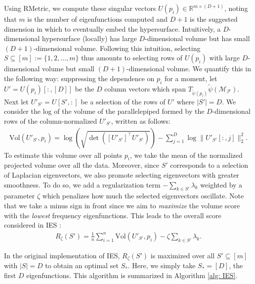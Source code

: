 \documentclass[reqno, 12pt]{article}
\begin{document}
Using RMetric, we compute these singular vectors $U(p_i) \in \mathbb{R}^{m \times (D+1)}$, noting that $m$ is the number of eigenfunctions computed and $D+1$ is the suggested dimension in which to eventually embed the hypersurface. Intuitively, a $D$-dimensional hypersurface (locally) has large $ D$-dimensional volume but has small $ (D+1)$-dimensional volume. Following this intuition, selecting $S \subseteq [m]:=\{1,2,\ldots,m\}$ thus amounts to selecting rows of $U(p_i)$ with large $D$-dimensional volume but small $(D+1)$-dimensional volume. We quantify this in the following way: suppressing the dependence on $p_i$ for a moment, let $U' = U(p_i)[:,[D]]$ be the $D$ column vectors which span $T_{\tilde{\psi}(p_i)}\tilde{\psi}(\mathcal{M}_{\mathcal{F}})$. Next let $U'_{S'} = U[S',:]$ be a selection of the rows of $U'$ where $|S'| = D$. We consider the log of the volume of the parallelepiped formed by the $D$-dimensional rows of the column-normalized $U'_{S'}$, written as follows: 
\begin{align}
    \text{Vol}(U'_{S'},p_i) = \log \left( \sqrt{\det \left(\left[U'_{S'}\right]^{\top}U'_{S'}\right)}\right) -\sum_{j=1}^{D}\log\|U'_{S'}[:,j]\|_{2}^{2}. \label{eq: S dim volume}
\end{align}
To estimate this volume over all points $p_i$, we take the mean of the normalized projected volume over all the data. Moreover, since $S'$ corresponds to a selection of Laplacian eigenvectors, we also promote selecting eigenvectors with greater smoothness. To do so, we add a regularization term $-\sum_{k \in S'}\lambda_k$ weighted by a parameter $\zeta$ which penalizes how much the selected eigenvectors oscillate. Note that we take a minus sign in front since we aim to \emph{maximize} the volume score with the \emph{lowest} frequency eigenfunctions. This leads to the overall score considered in IES \parencite{chen2019selecting}: 
\begin{align}
    R_{\zeta}(S') = \frac{1}{n}\sum_{i=1}^{n}\text{Vol}(U'_{S'},p_i) - \zeta\sum_{k \in S'}\lambda_k. \label{eq: overall volume score}
\end{align}

In the original implementation of IES, $R_{\zeta}(S')$ is maximized over all $S' \subseteq [m]$ with $ |S| = D$ to obtain an optimal set $S_*$. Here, we simply take $S_* = [D]$, the first $D$ eigenfunctions.  This algorithm is summarized in Algorithm \ref{alg: IES}. 
\end{document}
